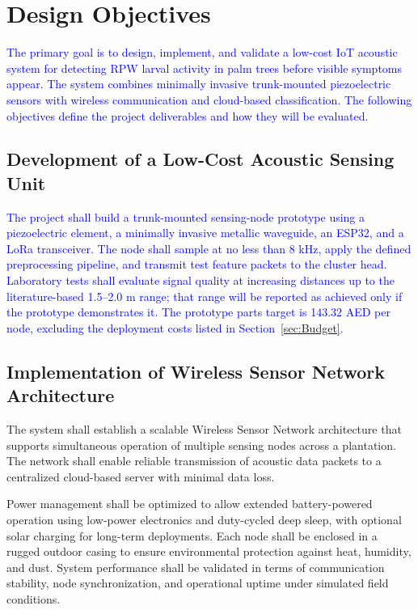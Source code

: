 \documentclass[12pt,a4paper,oneside]{memoir}
\newcommand{\earlierrevision}[1]{\textcolor{blue}{#1}}
\begin{document}
\section{Design Objectives}
\label{sec:Objectives}
 
\earlierrevision{The primary goal is to design, implement, and validate a low-cost IoT acoustic system for detecting RPW larval activity in palm trees before visible symptoms appear. The system combines minimally invasive trunk-mounted piezoelectric sensors with wireless communication and cloud-based classification. The following objectives define the project deliverables and how they will be evaluated.}
 
\subsection{Development of a Low-Cost Acoustic Sensing Unit}
 
\earlierrevision{The project shall build a trunk-mounted sensing-node prototype using a piezoelectric element, a minimally invasive metallic waveguide, an ESP32, and a LoRa transceiver. The node shall sample at no less than 8 kHz, apply the defined preprocessing pipeline, and transmit test feature packets to the cluster head. Laboratory tests shall evaluate signal quality at increasing distances up to the literature-based 1.5--2.0 m range; that range will be reported as achieved only if the prototype demonstrates it. The prototype parts target is 143.32 AED per node, excluding the deployment costs listed in Section~\ref{sec:Budget}.}
 
\subsection{Implementation of Wireless Sensor Network Architecture}
 
The system shall establish a scalable Wireless Sensor Network architecture that supports simultaneous operation of multiple sensing nodes across a plantation. The network shall enable reliable transmission of acoustic data packets to a centralized cloud-based server with minimal data loss.
 
Power management shall be optimized to allow extended battery-powered operation using low-power electronics and duty-cycled deep sleep, with optional solar charging for long-term deployments. Each node shall be enclosed in a rugged outdoor casing to ensure environmental protection against heat, humidity, and dust. System performance shall be validated in terms of communication stability, node synchronization, and operational uptime under simulated field conditions.
 
\end{document}
